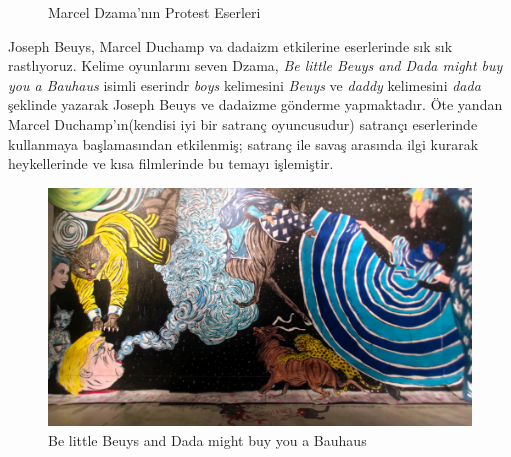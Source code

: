 \begin{figure}[H]
    \centering
    \hfill
    \caption{Marcel Dzama'nın Protest Eserleri}
\end{figure}
\indent Joseph Beuys, Marcel Duchamp va dadaizm etkilerine eserlerinde sık sık rastlıyoruz. Kelime oyunlarını seven Dzama, \textit{Be little Beuys and Dada might buy you a Bauhaus} isimli eserindr \textit{boys} kelimesini \textit{Beuys} ve \textit{daddy} kelimesini \textit{dada} şeklinde yazarak Joseph Beuys ve dadaizme gönderme yapmaktadır. Öte yandan Marcel Duchamp'ın(kendisi iyi bir satranç oyuncusudur) satrançı eserlerinde kullanmaya başlamasından etkilenmiş; satranç ile savaş arasında ilgi kurarak heykellerinde ve kısa filmlerinde bu temayı işlemiştir.
\begin{figure}[H]
    \centering
    \includegraphics[width=0.9\linewidth]{assets/dzama_1.jpg}
    \caption{Be little Beuys and Dada might buy you a Bauhaus}
\end{figure}